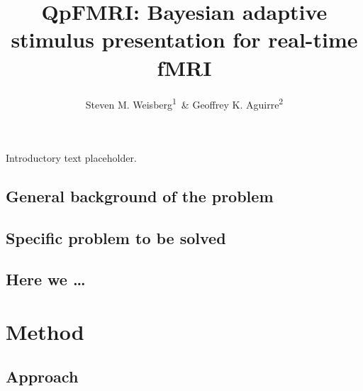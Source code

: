 \documentclass[
  man,floatsintext]{apa6}
\affiliation{
\vspace{0.5cm}
\textsuperscript{1} University of Florida\\\textsuperscript{2} University of Pennsylvania}
\title{QpFMRI: Bayesian adaptive stimulus presentation for real-time fMRI}
\author{Steven M. Weisberg\textsuperscript{1}~\& Geoffrey K. Aguirre\textsuperscript{2}}
\date{}
\begin{document}
\maketitle

Introductory text placeholder.

\hypertarget{general-background-of-the-problem}{%
\subsection{General background of the problem}\label{general-background-of-the-problem}}

\hypertarget{specific-problem-to-be-solved}{%
\subsection{Specific problem to be solved}\label{specific-problem-to-be-solved}}

\hypertarget{here-we}{%
\subsection{Here we \ldots{}}\label{here-we}}

\hypertarget{method}{%
\section{Method}\label{method}}

\hypertarget{approach}{%
\subsection{Approach}\label{approach}}
\end{document}
